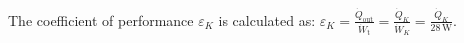 The coefficient of performance \( \varepsilon_K \) is calculated as:  
\( \varepsilon_K = \frac{\dot{Q}_{\text{out}}}{\dot{W}_{\text{t}}} = \frac{\dot{Q}_K}{\dot{W}_K} = \frac{\dot{Q}_K}{28 \, \text{W}} \).